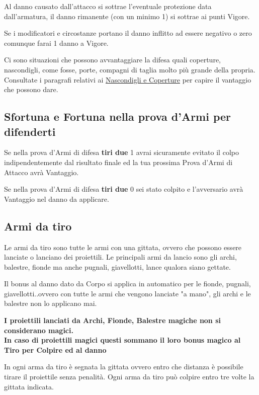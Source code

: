 \documentclass[12pt,a4paper,twoside,openany]{book}
\begin{document}
\begin{multicols}{2}
Al danno causato dall'attacco si sottrae l'eventuale protezione data dall'armatura, il danno rimanente (con un minimo 1) si sottrae ai punti Vigore.

Se i modificatori e circostanze portano il danno inflitto ad essere negativo o zero comunque farai 1 danno a Vigore.

Ci sono situazioni che possono avvantaggiare la difesa quali coperture, nascondigli, come fosse, porte, compagni di taglia molto più grande della propria. Consultate i paragrafi relativi ai \hyperlink{coperture}{Nascondigli e Coperture} per capire il vantaggio che possono dare.

\subsection{Sfortuna e Fortuna nella prova d'Armi per difenderti}

Se nella prova d'Armi di difesa \textbf{tiri due} 1 avrai sicuramente evitato il colpo indipendentemente dal risultato finale ed la tua prossima Prova d'Armi di Attacco avrà Vantaggio.

Se nella prova d'Armi di difesa \textbf{tiri due} 0 sei stato colpito e l'avversario avrà Vantaggio nel danno da applicare.

\subsection{Armi da tiro}\label{armidatiro}

Le armi da tiro sono tutte le armi con una gittata, ovvero che possono essere lanciate o lanciano dei proiettili. Le principali armi da lancio sono gli archi, balestre, fionde ma anche pugnali, giavellotti, lance qualora siano gettate.

Il bonus al danno dato da Corpo si applica in automatico per le fionde, pugnali, giavellotti..ovvero con tutte le armi che vengono lanciate "a mano", gli archi e le balestre non lo applicano mai.

\textbf{I proiettili lanciati da Archi, Fionde, Balestre magiche non si considerano magici.\\
In caso di proiettili magici questi sommano il loro bonus magico al Tiro per Colpire ed al danno}

In ogni arma da tiro è segnata la gittata ovvero entro che distanza è possibile tirare il proiettile senza penalità. Ogni arma da tiro può colpire entro tre volte la gittata indicata.


\end{multicols}
\end{document}
